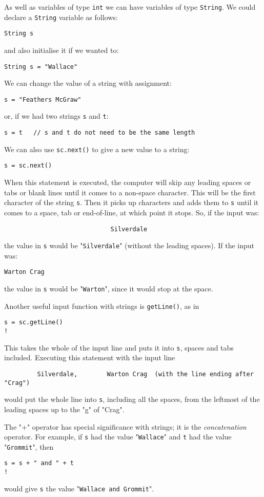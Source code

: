 As well as variables of type  \verb!int! we can have variables of type
 \verb!String!.  
We could declare a  \verb!String! variable as follows:
\begin{Verbatim}
String s
\end{Verbatim}
and also initialise it if we wanted to:
\begin{Verbatim}
String s = "Wallace"
\end{Verbatim}
We can change the value of a string with assignment:
\begin{Verbatim}
s = "Feathers McGraw"
\end{Verbatim}
or, if we had two strings \verb!s! and \verb!t!:
\begin{Verbatim}
s = t   // s and t do not need to be the same length
\end{Verbatim}
We can also use \verb!sc.next()! to give a new value to a string:
\begin{Verbatim}
s = sc.next()
\end{Verbatim}
When this statement is executed, the computer will skip any leading spaces
or tabs or blank lines until it comes to a non-space character.  This
will be the first character of the string \verb!s!.  Then it picks up
characters and adds them to \verb!s! until it comes to a space, tab or
end-of-line, at which point it stops.  So, if the input was:
\begin{Verbatim}
                             Silverdale
\end{Verbatim}
the value in \verb!s! would be "\verb!Silverdale!" (without the leading spaces).
If the input was:
\begin{Verbatim}
Warton Crag
\end{Verbatim}
the value in \verb!s! would be "\verb!Warton!", since it would stop at the space.

Another useful input function with strings is \verb!getLine()!, as in
\begin{Verbatim}
s = sc.getLine()
!\end{Verbatim}
This takes the whole of the input line and puts it into  \verb!s!, spaces and
tabs included.  Executing this statement with the input line
\begin{Verbatim}
         Silverdale,        Warton Crag  (with the line ending after "Crag") 
\end{Verbatim}
would put the whole line into \verb!s!, including all the spaces, from
the leftmost of the leading spaces up to the "g" of "Crag".

The "+" operator has special significance with strings; it is the
\emph{concatenation} operator.  For example, if  \verb!s! had the value
"\verb!Wallace!" and \verb!t! had the value "\verb!Grommit!", then
\begin{Verbatim}
s = s + " and " + t
!\end{Verbatim}
would give  \verb!s! the value "\verb!Wallace and Grommit!".


